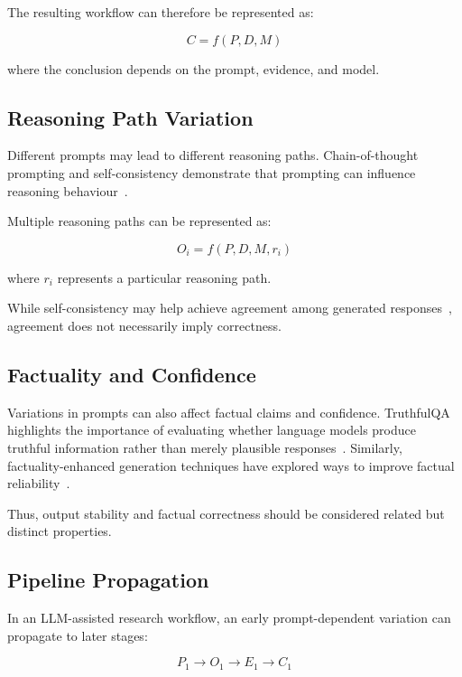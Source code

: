 \documentclass[acmsmall,screen,review]{acmart}
\begin{document}
The resulting workflow can therefore be represented as:

\begin{equation}
C=f(P,D,M)
\label{eq:conclusion}
\end{equation}

where the conclusion depends on the prompt, evidence, and model.

\subsection{Reasoning Path Variation}

Different prompts may lead to different reasoning paths. Chain-of-thought prompting and self-consistency demonstrate that prompting can influence reasoning behaviour~\cite{wei2022,wang2023}.

Multiple reasoning paths can be represented as:

\begin{equation}
O_i=f(P,D,M,r_i)
\label{eq:reasoning-path}
\end{equation}

where $r_i$ represents a particular reasoning path.

While self-consistency may help achieve agreement among generated responses~\cite{wang2023}, agreement does not necessarily imply correctness.

\subsection{Factuality and Confidence}

Variations in prompts can also affect factual claims and confidence. TruthfulQA highlights the importance of evaluating whether language models produce truthful information rather than merely plausible responses~\cite{lin2022}. Similarly, factuality-enhanced generation techniques have explored ways to improve factual reliability~\cite{lee2022}.

Thus, output stability and factual correctness should be considered related but distinct properties.

\subsection{Pipeline Propagation}

In an LLM-assisted research workflow, an early prompt-dependent variation can propagate to later stages:

\begin{equation}
P_1\rightarrow O_1\rightarrow E_1\rightarrow C_1
\label{eq:propagation}
\end{equation}
\end{document}
